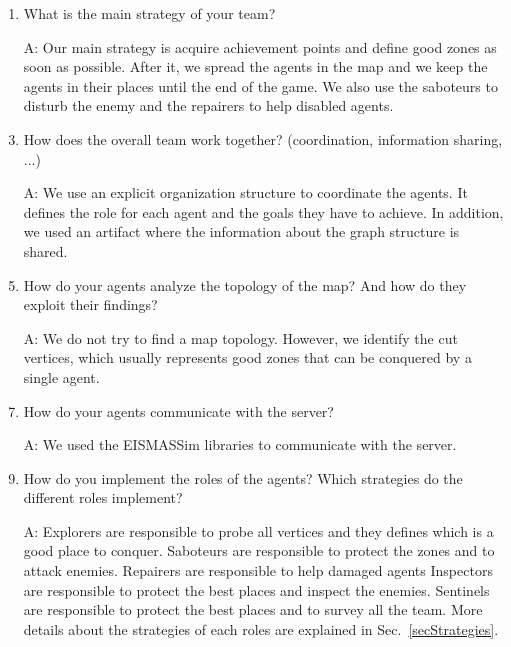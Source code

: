 \begin{enumerate}
\item What is the main strategy of your team?
 	\item[A:] Our main strategy is acquire achievement points and define good zones as soon as possible. After it, we spread the agents in the map and we keep the agents in their places until the end of the game. We also use the saboteurs to disturb the enemy and the repairers to help disabled agents.\\
 	 	
\item How does the overall team work together? (coordination, information sharing, ...)
	\item[A:] We use an explicit organization structure to coordinate the agents. It defines the role for each agent and the goals they have to achieve. In addition, we used an artifact where the information about the graph structure is shared.	\\
	
\item How do your agents analyze the topology of the map? And how do they exploit their findings?
	\item[A:] We do not try to find a map topology. However, we identify the cut vertices, which usually represents good zones that can be conquered by a single agent. \\
	
\item How do your agents communicate with the server?
	\item[A:] We used the EISMASSim libraries to communicate with the server.\\
	
\item How do you implement the roles of the agents? Which strategies do the different roles implement?
	\item[A:] Explorers are responsible to probe all vertices and they defines which is a good place to conquer. 
	Saboteurs are responsible to protect the zones and to attack enemies. 
	Repairers are responsible to help damaged agents 
	Inspectors are responsible to protect the best places and inspect the enemies. 
	Sentinels are responsible to protect the best places and to survey all the team.
	More details about the strategies of each roles are explained in Sec.~\ref{secStrategies}.\\
	

\end{enumerate}
